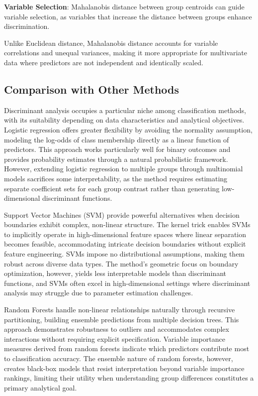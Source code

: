 \documentclass[
]{article}
\begin{document}
\textbf{Variable Selection}: Mahalanobis distance between group
centroids can guide variable selection, as variables that increase the
distance between groups enhance discrimination.

Unlike Euclidean distance, Mahalanobis distance accounts for variable
correlations and unequal variances, making it more appropriate for
multivariate data where predictors are not independent and identically
scaled.

\subsection{Comparison with Other Methods}

Discriminant analysis occupies a particular niche among classification
methods, with its suitability depending on data characteristics and
analytical objectives. Logistic regression offers greater flexibility by
avoiding the normality assumption, modeling the log-odds of class
membership directly as a linear function of predictors. This approach
works particularly well for binary outcomes and provides probability
estimates through a natural probabilistic framework. However, extending
logistic regression to multiple groups through multinomial models
sacrifices some interpretability, as the method requires estimating
separate coefficient sets for each group contrast rather than generating
low-dimensional discriminant functions.

Support Vector Machines (SVM) provide powerful alternatives when
decision boundaries exhibit complex, non-linear structure. The kernel
trick enables SVMs to implicitly operate in high-dimensional feature
spaces where linear separation becomes feasible, accommodating intricate
decision boundaries without explicit feature engineering. SVMs impose no
distributional assumptions, making them robust across diverse data
types. The method's geometric focus on boundary optimization, however,
yields less interpretable models than discriminant functions, and SVMs
often excel in high-dimensional settings where discriminant analysis may
struggle due to parameter estimation challenges.

Random Forests handle non-linear relationships naturally through
recursive partitioning, building ensemble predictions from multiple
decision trees. This approach demonstrates robustness to outliers and
accommodates complex interactions without requiring explicit
specification. Variable importance measures derived from random forests
indicate which predictors contribute most to classification accuracy.
The ensemble nature of random forests, however, creates black-box models
that resist interpretation beyond variable importance rankings, limiting
their utility when understanding group differences constitutes a primary
analytical goal.
\end{document}
